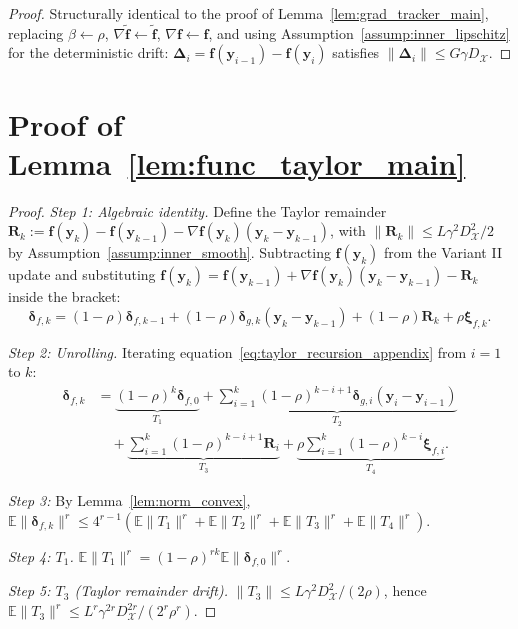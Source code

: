 \documentclass{article}
\def\eqref#1{equation~\ref{#1}}
\newcommand{\cX}{\mathcal{X}}
\def\vf{{\bm{f}}}
\def\vy{{\bm{y}}}
\def\vR{{\bm{R}}}
\newcommand{\E}{\mathbb{E}}
\begin{document}
\begin{proof}
Structurally identical to the proof of Lemma~\ref{lem:grad_tracker_main}, replacing $\beta \leftarrow \rho$, $\nabla \tilde\vf \leftarrow \tilde\vf$, $\nabla \vf \leftarrow \vf$, and using Assumption~\ref{assump:inner_lipschitz} for the deterministic drift: $\bm\Delta_i = \vf(\vy_{i-1}) - \vf(\vy_i)$ satisfies $\|\bm\Delta_i\| \le G\gamma D_\cX$.
\end{proof}

\section{Proof of Lemma~\ref{lem:func_taylor_main}} \label{sec:proof_taylor}

\begin{proof}
\emph{Step 1: Algebraic identity.} Define the Taylor remainder $\vR_k := \vf(\vy_k) - \vf(\vy_{k-1}) - \nabla\vf(\vy_k)(\vy_k - \vy_{k-1})$, with $\|\vR_k\| \le L\gamma^2 D_\cX^2/2$ by Assumption~\ref{assump:inner_smooth}. Subtracting $\vf(\vy_k)$ from the Variant II update and substituting $\vf(\vy_k) = \vf(\vy_{k-1}) + \nabla\vf(\vy_k)(\vy_k - \vy_{k-1}) - \vR_k$ inside the bracket:
\begin{equation}\label{eq:taylor_recursion_appendix}
\bm{\delta}_{f,k} = (1-\rho) \bm{\delta}_{f,k-1} + (1-\rho) \bm{\delta}_{g,k}(\vy_k - \vy_{k-1}) + (1-\rho) \vR_k + \rho \bm{\xi}_{f,k}.
\end{equation}

\emph{Step 2: Unrolling.} Iterating \eqref{eq:taylor_recursion_appendix} from $i = 1$ to $k$:
\begin{align*}
\bm\delta_{f,k} &= \underbrace{(1-\rho)^k \bm{\delta}_{f,0}}_{T_1} + \underbrace{\sum_{i=1}^k (1-\rho)^{k-i+1} \bm{\delta}_{g,i}(\vy_i - \vy_{i-1})}_{T_2} \\
&\quad + \underbrace{\sum_{i=1}^k (1-\rho)^{k-i+1} \vR_i}_{T_3} + \underbrace{\rho \sum_{i=1}^k (1-\rho)^{k-i} \bm\xi_{f,i}}_{T_4}.
\end{align*}

\emph{Step 3:} By Lemma~\ref{lem:norm_convex}, $\E\|\bm\delta_{f,k}\|^r \le 4^{r-1}(\E\|T_1\|^r + \E\|T_2\|^r + \E\|T_3\|^r + \E\|T_4\|^r)$.

\emph{Step 4: $T_1$.} $\E\|T_1\|^r = (1-\rho)^{rk}\E\|\bm\delta_{f,0}\|^r$.

\emph{Step 5: $T_3$ (Taylor remainder drift).} $\|T_3\| \le L\gamma^2 D_\cX^2/(2\rho)$, hence $\E\|T_3\|^r \le L^r\gamma^{2r} D_\cX^{2r}/(2^r\rho^r)$.


\end{proof}
\end{document}
